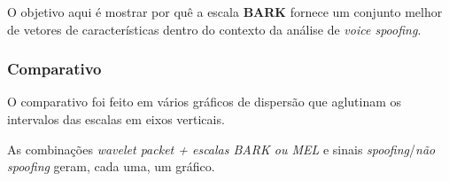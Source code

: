 				\par O objetivo aqui é mostrar por quê a escala \textbf{BARK} fornece um conjunto melhor de vetores de características dentro do contexto da análise de \textit{voice spoofing}.

			\subsubsection{Comparativo}
				\par O comparativo foi feito em vários gráficos de dispersão que aglutinam os intervalos das escalas em eixos verticais. 
				\par As combinações \textit{wavelet packet + escalas BARK ou MEL} e sinais \textit{spoofing}/\textit{não spoofing} geram, cada uma, um gráfico.
